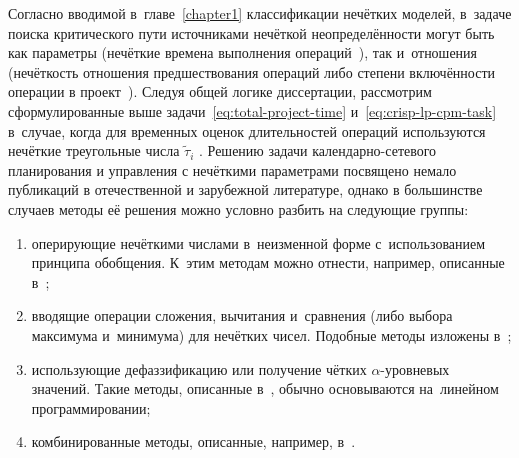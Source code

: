 Согласно вводимой в~главе~\ref{chapter1} классификации нечётких моделей, в~задаче поиска критического пути источниками нечёткой неопределённости могут быть как параметры (нечёткие времена выполнения операций~\cite{Elizabeth_FCPM}), так и~отношения (нечёткость отношения предшествования операций либо степени включённости операции в проект~\cite{Iran_Morovatdar}). Следуя общей логике диссертации, рассмотрим сформулированные выше задачи~\eqref{eq:total-project-time} и~\eqref{eq:crisp-lp-cpm-task} в~случае, когда для временных оценок длительностей операций используются нечёткие треугольные числа $\tilde \tau_i$ . Решению задачи календарно-сетевого планирования и управления с нечёткими параметрами посвящено немало публикаций в отечественной и зарубежной литературе, однако в большинстве случаев методы её решения можно условно разбить на следующие группы:
\begin{enumerate}
  \item оперирующие нечёткими числами в~неизменной форме с~использованием принципа обобщения. К~этим методам можно отнести, например, описанные в~\cite{Balashov_IPU, Chanas_Zielinski_Criticality, Chanas_Zielinski_FCPM};
  \item вводящие операции сложения, вычитания и~сравнения (либо выбора максимума и~минимума) для нечётких чисел. Подобные методы изложены в~\cite{Uskov_FCPM, Leondes, Dubois_Prade, Iran_Railways};
  \item использующие дефаззификацию или получение чётких $\alpha$-уровневых значений. Такие методы, описанные в~\cite{Egyptians, Indians_FCPM, Chinese_CPM}, обычно основываются на~линейном программировании;
  \item комбинированные методы, описанные, например, в~\cite{Liang_Han_FCPM}.
\end{enumerate}

